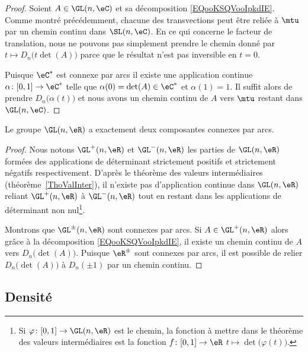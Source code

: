 \begin{proof}
	Soient \( A\in\GL(n,\eC)\) et sa décomposition \eqref{EQooKSQVooIpkdIE}. Comme montré précédemment, chacune des transvections peut être reliée à \( \mtu\) par un chemin continu dans \( \SL(n,\eC)\). En ce qui concerne le facteur de translation,  nous ne pouvons pas simplement prendre le chemin donné par \( t\mapsto D_n\big( t\det(A) \big)\) parce que le résultat n'est pas inversible en \( t=0\).

	Puisque \( \eC^*\) est connexe par arcs il existe une application continue \( \alpha\colon \mathopen[ 0 , 1 \mathclose]\to \eC^*\) telle que \( \alpha(0)=\det(A)\in \eC^*\) et \( \alpha(1)=1\). Il suffit alors de prendre \( D_n\big( \alpha(t) \big)\) et nous avons un chemin continu de \( A\) vers \( \mtu\) restant dans \( \GL(n,\eC)\).
\end{proof}

\begin{proposition} \label{PROPooBIYQooWLndSW}
	Le groupe \( \GL(n,\eR)\) a exactement deux composantes connexes par arcs.
\end{proposition}

\begin{proof}
	Nous notons \( \GL^+(n,\eR)\) et \( \GL^-(n,\eR)\) les parties de \( \GL(n,\eR)\) formées des applications de déterminant strictement positifs et strictement négatifs respectivement. D'après le théorème des valeurs intermédiaires (théorème~\ref{ThoValInter}), il n'existe pas d'application continue dans \( \GL(n,\eR)\) reliant \( \GL^+(n,\eR)\) à \( \GL^-(n,\eR)\) tout en restant dans les applications de déterminant non nul\footnote{Si \( \varphi\colon \mathopen[ 0 , 1 \mathclose]\to \GL(n,\eR)\) est le chemin, la fonction à mettre dans le théorème des valeurs intermédiaires est la fonction \( f\colon \mathopen[ 0 , 1 \mathclose]\to \eR\) \(t\mapsto \det\big( \varphi(t) \big)\).}.

	Montrons que \( \GL^{\pm}(n,\eR)\) sont connexes par arcs. Si \( A\in\GL^+(n,\eR)\) alors grâce à la décomposition \eqref{EQooKSQVooIpkdIE}, il existe un chemin continu de \( A\) vers \( D_n\big( \det(A) \big)\). Puisque \( \eR^{\pm}\) sont connexes par arcs, il est possible de relier \( D_n\big( \det(A) \big)\) à \( D_n(\pm 1)\) par un chemin continu.
\end{proof}

\subsection{Densité}

